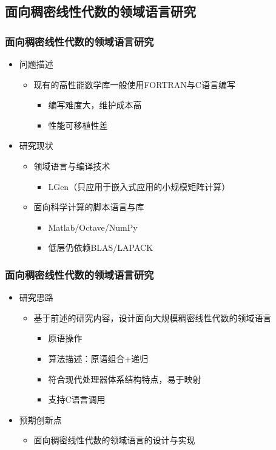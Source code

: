 \documentclass[aspectratio=169]{beamer}
\begin{document}
\subsection[领域语言研究]{面向稠密线性代数的领域语言研究}

\begin{frame}
  \frametitle{面向稠密线性代数的领域语言研究}
  \begin{itemize}
  \item 问题描述
    \begin{itemize}
    \item 现有的高性能数学库一般使用FORTRAN与C语言编写
      \begin{itemize}
      \item 编写难度大，维护成本高
      \item 性能可移植性差
      \end{itemize}
    \end{itemize}
  \item 研究现状
    \begin{itemize}
    \item 领域语言与编译技术
      \begin{itemize}
      \item LGen（只应用于嵌入式应用的小规模矩阵计算）
      \end{itemize}
    \item 面向科学计算的脚本语言与库
      \begin{itemize}
      \item Matlab/Octave/NumPy
      \item 低层仍依赖BLAS/LAPACK
      \end{itemize}
    \end{itemize}
  \end{itemize}
\end{frame}

\begin{frame}
  \frametitle{面向稠密线性代数的领域语言研究}
  \begin{itemize}
  \item 研究思路
    \begin{itemize}
    \item 基于前述的研究内容，设计面向大规模稠密线性代数的领域语言
      \begin{itemize}
      \item 原语操作
      \item 算法描述：原语组合+递归
      \item 符合现代处理器体系结构特点，易于映射
      \item 支持C语言调用
      \end{itemize}
    \end{itemize}
  \item 预期创新点
    \begin{itemize}
    \item 面向稠密线性代数的领域语言的设计与实现
    \end{itemize}
  \end{itemize}
\end{frame}
\end{document}

